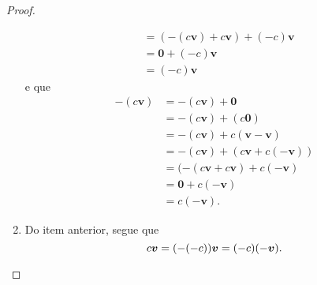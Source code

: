 \begin{proof}
\begin{enumerate}
\begin{align*}
			&= (\bm -(c\bm{v}) + c\bm v) + (-c) \bm v \\
			&= \bm 0 + (-c) \bm v \\
			&= (-c) \bm v
		\end{align*}
e que
		\begin{align*}
		-(c\bm{v}) &= -(c\bm{v}) + \bm 0 \\
			&= -(c\bm v) + (c \bm 0) \\
			&= -(c\bm v) + c(\bm v - \bm v) \\
			&= -(c\bm v) + (c\bm v + c(- \bm v)) \\
			&= (-(c\bm v + c\bm v) + c(- \bm v) \\
			&= \bm 0 + c(- \bm v) \\
			&= c(- \bm v).
		\end{align*}
	\item Do item anterior, segue que
		\begin{equation*}
		c\bm v = (-(-c))\bm v = (-c)(- \bm v).  \qedhere
		\end{equation*}
	\end{enumerate}
\end{proof}

